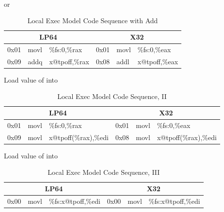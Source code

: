 \begin{description}
or

\begin{table}[H]
\Hrule
\caption{Local Exec Model Code Sequence with Add}
\begin{center}
\code\small{
\begin{tabular}{lll|lll}
\multicolumn{3}{c}{LP64} & \multicolumn{3}{c}{X32} \\
\hline
0x01 & movl & \%fs:0,\%rax		& 0x01 & movl & \%fs:0,\%eax \\
0x09 & addq & x@tpoff,\%rax		& 0x08 & addl & x@tpoff,\%eax \\
\end{tabular}
}
\end{center}
\Hrule
\end{table}

\item[\textindex{Local Exec Model, II}]
  Load value of  into 

\begin{table}[H]
\Hrule
\caption{Local Exec Model Code Sequence, II}
\begin{center}
\code\small{
\begin{tabular}{lll|lll}
\multicolumn{3}{c}{LP64} & \multicolumn{3}{c}{X32} \\
\hline
0x01 & movl & \%fs:0,\%rax		& 0x01 & movl & \%fs:0,\%eax \\
0x09 & movl & x@tpoff(\%rax),\%edi	& 0x08 & movl & x@tpoff(\%rax),\%edi \\
\end{tabular}
}
\end{center}
\Hrule
\end{table}

\item[\textindex{Local Exec Model, III}]
  Load value of  into 

\begin{table}[H]
\Hrule
\caption{Local Exec Model Code Sequence, III}
\begin{center}
\code\small{
\begin{tabular}{lll|lll}
\multicolumn{3}{c}{LP64} & \multicolumn{3}{c}{X32} \\
\hline
0x00 & movl & \%fs:x@tpoff,\%edi	& 0x00 & movl & \%fs:x@tpoff,\%edi \\
\end{tabular}
}
\end{center}
\Hrule
\end{table}

\end{description}

